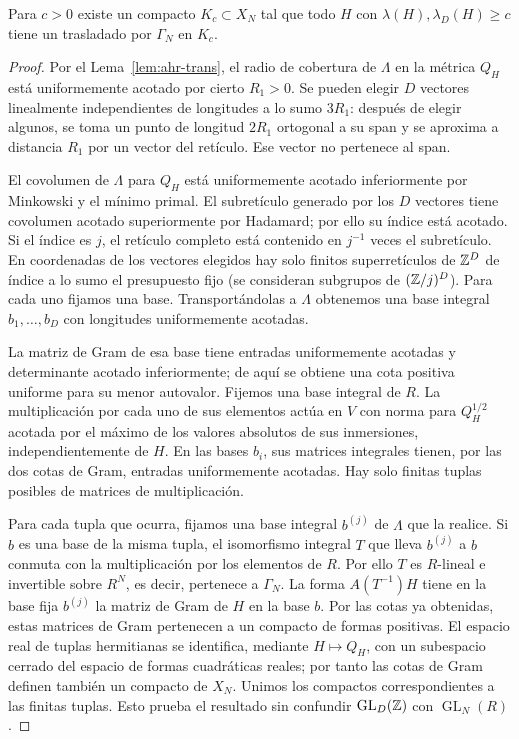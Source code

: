 \begin{proposicion}
\label{prop:ahr-thick}
Para $c>0$ existe un compacto $K_c\subset X_N$ tal que todo $H$ con $\lambda(H),\lambda_D(H)\ge c$ tiene un trasladado por $\Gamma_N$ en $K_c$.
\end{proposicion}
\begin{proof}
Por el Lema~\ref{lem:ahr-trans}, el radio de cobertura de $\Lambda$ en la métrica $Q_H$ está uniformemente acotado por cierto $R_1>0$. Se pueden elegir $D$ vectores linealmente independientes de longitudes a lo sumo $3R_1$: después de elegir algunos, se toma un punto de longitud $2R_1$ ortogonal a su span y se aproxima a distancia $R_1$ por un vector del retículo. Ese vector no pertenece al span.

El covolumen de $\Lambda$ para $Q_H$ está uniformemente acotado inferiormente por Minkowski y el mínimo primal. El subretículo generado por los $D$ vectores tiene covolumen acotado superiormente por Hadamard; por ello su índice está acotado. Si el índice es $j$, el retículo completo está contenido en $j^{-1}$ veces el subretículo. En coordenadas de los vectores elegidos hay solo finitos superretículos de $\mathbb{Z}^D$ de índice a lo sumo el presupuesto fijo (se consideran subgrupos de $(\mathbb{Z}/j)^D$). Para cada uno fijamos una base. Transportándolas a $\Lambda$ obtenemos una base integral $b_1,\ldots,b_D$ con longitudes uniformemente acotadas.

La matriz de Gram de esa base tiene entradas uniformemente acotadas y determinante acotado inferiormente; de aquí se obtiene una cota positiva uniforme para su menor autovalor. Fijemos una base integral de $R$. La multiplicación por cada uno de sus elementos actúa en $V$ con norma para $Q_H^{1/2}$ acotada por el máximo de los valores absolutos de sus inmersiones, independientemente de $H$. En las bases $b_i$, sus matrices integrales tienen, por las dos cotas de Gram, entradas uniformemente acotadas. Hay solo finitas tuplas posibles de matrices de multiplicación.

Para cada tupla que ocurra, fijamos una base integral $b^{(j)}$ de $\Lambda$ que la realice. Si $b$ es una base de la misma tupla, el isomorfismo integral $T$ que lleva $b^{(j)}$ a $b$ conmuta con la multiplicación por los elementos de $R$. Por ello $T$ es $R$-lineal e invertible sobre $R^N$, es decir, pertenece a $\Gamma_N$. La forma $A(T^{-1})H$ tiene en la base fija $b^{(j)}$ la matriz de Gram de $H$ en la base $b$. Por las cotas ya obtenidas, estas matrices de Gram pertenecen a un compacto de formas positivas. El espacio real de tuplas hermitianas se identifica, mediante $H\mapsto Q_H$, con un subespacio cerrado del espacio de formas cuadráticas reales; por tanto las cotas de Gram definen también un compacto de $X_N$. Unimos los compactos correspondientes a las finitas tuplas. Esto prueba el resultado sin confundir $\operatorname{GL}_D(\mathbb{Z})$ con $\operatorname{GL}_N(R)$.
\end{proof}

